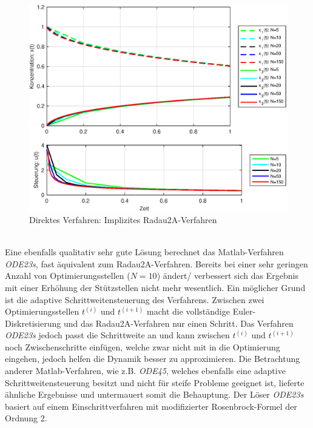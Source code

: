 \begin{figure}[h!]
	\centering
	\includegraphics[width=.98\textwidth]{images/Radau2A_Result}
	\caption{Direktes Verfahren: Implizites Radau2A-Verfahren}
	\label{fig:Radau2A}
\end{figure}
\\Eine ebenfalls qualitativ sehr gute Lösung berechnet das Matlab-Verfahren \textit{ODE23s}, fast äquivalent zum Radau2A-Verfahren. Bereits bei einer sehr geringen Anzahl von Optimierungsstellen ($N=10$) ändert/ verbessert sich das Ergebnis mit einer Erhöhung der Stützstellen nicht mehr wesentlich. Ein möglicher Grund ist die adaptive Schrittweitensteuerung des Verfahrens. Zwischen zwei Optimierungsstellen $t^{(i)}$ und $t^{(i+1)}$ macht die vollständige Euler-Diskretisierung und das Radau2A-Verfahren nur einen Schritt. Das Verfahren \textit{ODE23s} jedoch passt die Schrittweite an und kann zwischen $t^{(i)}$ und $t^{(i+1)}$ noch Zwischenschritte einfügen, welche zwar nicht mit in die Optimierung eingehen, jedoch helfen die Dynamik besser zu approximieren. Die Betrachtung anderer Matlab-Verfahren, wie z.B. \textit{ODE45}, welches ebenfalls eine adaptive Schrittweitensteuerung besitzt und nicht für steife Probleme geeignet ist, lieferte ähnliche Ergebnisse und untermauert somit die Behauptung. Der Löser \textit{ODE23s} basiert auf einem Einschrittverfahren mit modifizierter Rosenbrock-Formel der Ordnung 2. \cite{ode23s}
